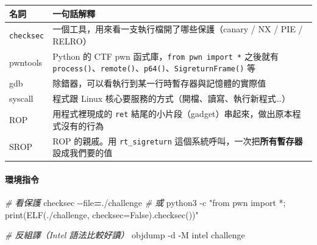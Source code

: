 \documentclass[10pt,a4paper]{article}
\newcounter{none}
\newenvironment{Shaded}{\begin{snugshade}}{\end{snugshade}}
\newcommand{\AttributeTok}[1]{\textcolor[rgb]{0.13,0.29,0.53}{#1}}
\newcommand{\CommentTok}[1]{\textcolor[rgb]{0.56,0.35,0.01}{\textit{#1}}}
\newcommand{\ExtensionTok}[1]{#1}
\newcommand{\NormalTok}[1]{#1}
\newcommand{\OperatorTok}[1]{\textcolor[rgb]{0.81,0.36,0.00}{\textbf{#1}}}
\newcommand{\StringTok}[1]{\textcolor[rgb]{0.31,0.60,0.02}{#1}}
\renewenvironment{Shaded}{%
  \def\FrameCommand{\fboxsep=3.2pt\colorbox{shadecolor}}%
  \MakeFramed{\advance\hsize-\width\FrameRestore\small}%
}{%
  \endMakeFramed
}
\begin{document}
{\def\LTcaptype{none} %
\begin{longtable}[]{@{}
  >{\raggedright\arraybackslash}p{}
  >{\raggedright\arraybackslash}p{}@{}}
\toprule\noalign{}
\begin{minipage}[b]{\linewidth}\raggedright
名詞
\end{minipage} & \begin{minipage}[b]{\linewidth}\raggedright
一句話解釋
\end{minipage} \\
\midrule\noalign{}
\endhead
\bottomrule\noalign{}
\endlastfoot
\texttt{checksec} & 一個工具，用來看一支執行檔開了哪些保護（canary / NX
/ PIE / RELRO） \\
pwntools & Python 的 CTF pwn 函式庫，\texttt{from\ \allowbreak{}pwn\ \allowbreak{}import\ \allowbreak{}*}
之後就有
\texttt{process()}、\texttt{remote()}、\texttt{p64()}、\texttt{SigreturnFrame()}
等 \\
gdb & 除錯器，可以看執行到某一行時暫存器與記憶體的實際值 \\
syscall & 程式跟 Linux
核心要服務的方式（開檔、讀寫、執行新程式\ldots） \\
ROP & 用程式裡現成的 \texttt{ret}
結尾的小片段（gadget）串起來，做出原本程式沒有的行為 \\
SROP & ROP 的親戚。用 \texttt{rt\_\allowbreak{}sigreturn}
這個系統呼叫，一次把\textbf{所有暫存器}設成我們要的值 \\
\end{longtable}
}

\paragraph{環境指令}\label{ux74b0ux5883ux6307ux4ee4}

\begin{Shaded}
\begin{Highlighting}[]
\CommentTok{\# 看保護}
\ExtensionTok{checksec} \AttributeTok{{-}{-}file}\OperatorTok{=}\NormalTok{./challenge}
\CommentTok{\# 或}
\ExtensionTok{python3} \AttributeTok{{-}c} \StringTok{"from pwn import *; print(ELF(\textquotesingle{}./challenge\textquotesingle{}, checksec=False).checksec())"}

\CommentTok{\# 反組譯（Intel 語法比較好讀）}
\ExtensionTok{objdump} \AttributeTok{{-}d} \AttributeTok{{-}M}\NormalTok{ intel challenge}
\end{Highlighting}
\end{Shaded}
\end{document}
